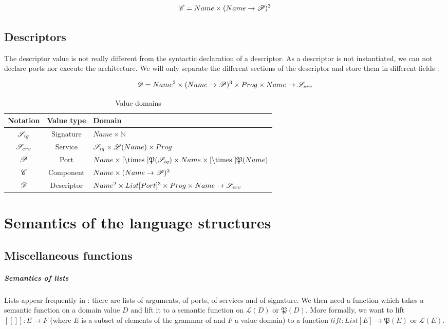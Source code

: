\[\mathcal{C}= Name \times (Name \rightarrow \mathcal{P})^3\]



\subsection{Descriptors}
The descriptor value is not really different from the syntactic declaration of a descriptor. As a descriptor is not instantiated, we can not declare ports nor execute the architecture. We will only separate the different sections of the descriptor and store them in different fields : 

\[\mathcal{D} = Name^2 \times (Name \rightarrow \mathcal{P})^3 \times Prog \times Name\rightarrow \mathcal{S}_{erv}\]


\begin{table}[!ht]
\begin{center}
\begin{tabular}{|c|c|l|}

\hline
Notation & Value type & Domain\\
\hline
 $\mathcal{S}_{ig}$  &  Signature & $Name \times \mathbb{N}$\\
 $\mathcal{S}_{erv}$ & Service & $\mathcal{S}_{ig} \times \mathcal{L}(Name) \times Prog$ \\
 $\mathcal{P}$ & Port & $Name \times \Cref \times \mathfrak{P}(\Sig)\times Name \times \Cref \times \mathfrak{P}(Name)$ \\
 $\mathcal{C}$ & Component & $ Name \times (Name \rightarrow \mathcal{P})^3$ \\
 $\mathcal{D}$ &  Descriptor & $ Name^2 \times List[Port]^3 \times Prog \times Name\rightarrow \mathcal{S}_{erv} $\\

\hline
\end{tabular}
\end{center}
\label{tab:DomVal}
\caption{Value domains}
\end{table}

\section{Semantics of the language structures}

\subsection{Miscellaneous functions}

\subparagraph{Semantics of lists}
Lists appear frequently in \compo : there are lists of arguments, of ports, of services and of signature. We then need a function which takes a semantic function on a domain value $D$ and lift it to a semantic function on $\mathcal{L}(D)$ or $\mathfrak{P}(D)$. More formally, we want to lift $[\![]\!] : E \rightarrow F$ (where $E$ is a subset of elements of the grammar of \compo and $F$ a value domain) to a function $lift: List[E] \rightarrow \mathfrak{P}(E)$ or $\mathcal{L}(E)$.

